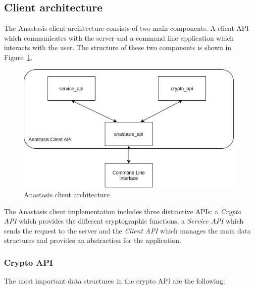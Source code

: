 \subsection{Client architecture}

The Anastasis client architecture consists of two main components. A client
API which communicates with the server and a command line application
which interacts with the user. The structure of these two components
is shown in Figure~\ref{fig:anastasis:client}.

\begin{figure}[H]
	\centering
	\includegraphics[scale=0.6]{images/client_api.png}
	\caption{Anastasis client architecture}
	\label{fig:anastasis:client}
\end{figure}

The Anastasis client implementation includes three distinctive APIs: a
{\em Crypto API} which provides the different cryptographic functions,
a {\em Service API} which sends the request to the server and the {\em
  Client API} which manages the main data structures and provides an
abstraction for the application.

\subsubsection{Crypto API}

The most important data structures in the crypto API are the following:


